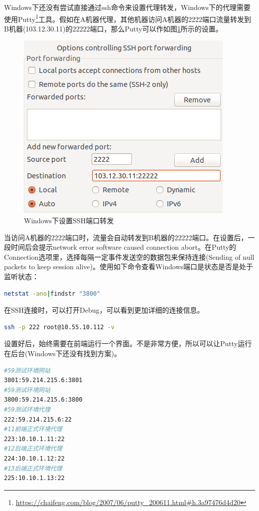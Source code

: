 \documentclass[12pt]{book}
\numberwithin{dummy}{section}
\theoremstyle{ocrenumbox}
\theoremstyle{blacknumex}
\theoremstyle{blacknumbox}
\theoremstyle{ocrenum}
\begin{document}
Windows下还没有尝试直接通过ssh命令来设置代理转发，Windows下的代理需要使用Putty\footnote{\url{https://chaifeng.com/blog/2007/06/putty\_200611.html\#h.3a97476d4d20}}工具。假如在A机器代理，其他机器访问A机器的2222端口流量转发到B机器(103.12.30.11)的22222端口，那么Putty可以作如图\ref{fig:puttyportforwarding}所示的设置。

\begin{figure}[htbp]
	\centering
	\includegraphics[scale=0.6]{puttyportforwarding.png}
	\caption{Windows下设置SSH端口转发}
	\label{fig:puttyportforwarding}
\end{figure}

当访问A机器的2222端口时，流量会自动转发到B机器的22222端口。在设置后，一段时间后会提示network error software caused connection abort。在Putty的Connection选项里，选择每隔一定事件发送空的数据包来保持连接(Sending of null packets to keep session alive)。使用如下命令查看Windows端口是状态是否是处于监听状态：

\begin{lstlisting}[language=Bash]
netstat -ano|findstr "3800"
\end{lstlisting}

在SSH连接时，可以打开Debug，可以看到更加详细的连接信息。

\begin{lstlisting}[language=Bash]
ssh -p 222 root@10.55.10.112 -v
\end{lstlisting}

设置好后，始终需要在前端运行一个界面。不是非常方便，所以可以让Putty运行在后台(Windows下还没有找到方案)。

\begin{lstlisting}[language=Bash]
#59测试环境网站
3801:59.214.215.6:3801
#59测试环境网站
3800:59.214.215.6:3800
#59测试环境代理
222:59.214.215.6:22
#11前端正式环境代理
223:10.10.1.11:22
#12后端正式环境代理
224:10.10.1.12:22
#13后端正式环境代理
225:10.10.1.13:22
\end{lstlisting}
\end{document}
